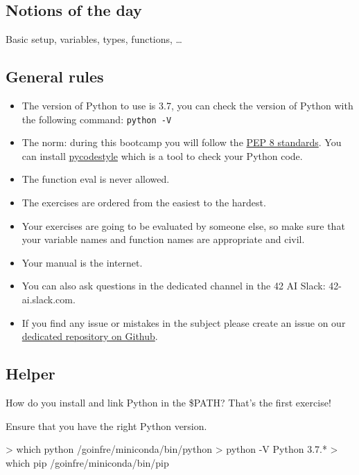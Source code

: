 \documentclass[]{article}
\newenvironment{Shaded}{\begin{snugshade}}{\end{snugshade}}
\newcommand{\NormalTok}[1]{\textcolor[rgb]{0.81,0.81,0.76}{#1}}
\begin{document}
\hypertarget{notions-of-the-day}{%
\subsection{Notions of the day}\label{notions-of-the-day}}

Basic setup, variables, types, functions, \ldots{}

\hypertarget{general-rules}{%
\subsection{General rules}\label{general-rules}}

\begin{itemize}
\item
  The version of Python to use is 3.7, you can check the version of
  Python with the following command: \texttt{python\ -V}
\item
  The norm: during this bootcamp you will follow the
  \href{https://www.python.org/dev/peps/pep-0008/}{PEP 8 standards}. You
  can install \href{https://pypi.org/project/pycodestyle}{pycodestyle}
  which is a tool to check your Python code.
\item
  The function eval is never allowed.
\item
  The exercises are ordered from the easiest to the hardest.
\item
  Your exercises are going to be evaluated by someone else, so make sure
  that your variable names and function names are appropriate and civil.
\item
  Your manual is the internet.
\item
  You can also ask questions in the dedicated channel in the 42 AI
  Slack: 42-ai.slack.com.
\item
  If you find any issue or mistakes in the subject please create an
  issue on our
  \href{https://github.com/42-AI/bootcamp_python/issues}{dedicated
  repository on Github}.
\end{itemize}

\hypertarget{helper}{%
\subsection{Helper}\label{helper}}

How do you install and link Python in the \$PATH? That's the first
exercise!

Ensure that you have the right Python version.

\begin{Shaded}
\begin{Highlighting}[]
\NormalTok{> which python}
\NormalTok{/goinfre/miniconda/bin/python}
\NormalTok{> python -V}
\NormalTok{Python 3.7.*}
\NormalTok{> which pip}
\NormalTok{/goinfre/miniconda/bin/pip}
\end{Highlighting}
\end{Shaded}
\end{document}
